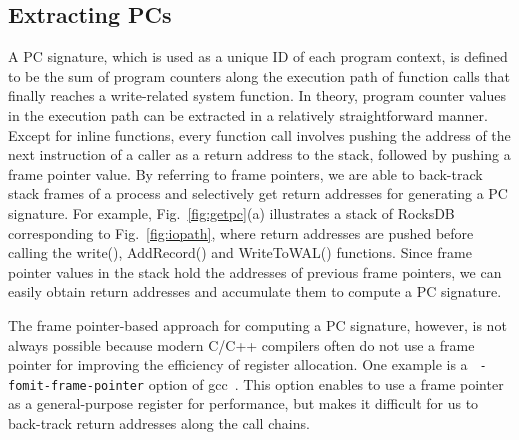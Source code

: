 \subsection{Extracting PCs}
A PC signature, which is used as a unique ID of each program context,
is defined
to be the sum of program counters along the execution path of function calls
that finally reaches a write-related system function.  In theory, program
counter values in the execution path can be extracted in a relatively
straightforward manner.  Except for inline functions, every function call
involves pushing the address of the next instruction of a caller as a return
address to the stack, followed by pushing a frame pointer value.  By referring
to frame pointers, we are able to back-track stack frames of a process and
selectively get return addresses for generating a PC signature.
For example, Fig.~\ref{fig:getpc}(a) illustrates a stack of RocksDB corresponding
to Fig.~\ref{fig:iopath}, where return addresses are pushed before calling
the \textsf{\small  write()}, \textsf{\small AddRecord()} and \textsf{\small
WriteToWAL()} functions.  Since frame pointer values in the stack hold the
addresses of previous frame pointers, we can easily obtain return addresses and
accumulate them to compute a PC signature.  


The frame pointer-based approach for computing a PC signature, however, is not
always possible because modern C/C++ compilers often do not use a frame pointer
for improving the efficiency of register allocation.  One example is a {\tt
-fomit-frame-pointer} option of gcc~\cite{GCC}.  This option enables to use a frame
pointer as a general-purpose register for performance, but makes it difficult for us
to back-track return addresses along the call chains.  

